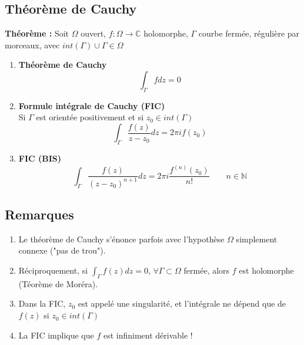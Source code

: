 \subsection{Théorème de Cauchy}
\textbf{Théorème :} Soit $\Omega$ ouvert, $f : \Omega\to\mathbb{C}$ holomorphe, $\Gamma$ courbe fermée, régulière par morceaux, avec $int(\Gamma) \cup \Gamma \in \Omega$
\begin{enumerate}
    \item \textbf{Théorème de Cauchy}
    $$\int_{\Gamma}fdz = 0$$
    \item \textbf{Formule intégrale de Cauchy (FIC)}\\
    Si $\Gamma$ est orientée positivement et si $z_0\in int(\Gamma)$
    $$\int_{\Gamma}\frac{f(z)}{z-z_0}dz = 2\pi i f(z_0)$$
    \item \textbf{FIC (BIS)}
    $$\int_{\Gamma}\frac{f(z)}{(z-z_0)^{n+1}}dz = 2\pi i \frac{f^{(n)}(z_0)}{n!} \quad\quad n\in\mathbb{N}$$
\end{enumerate}

\subsection{Remarques}
\begin{enumerate}
    \item Le théorème de Cauchy s'énonce parfois avec l'hypothèse $\Omega$ simplement connexe ("pas de trou").
    \item Réciproquement, si $\int_{\Gamma}f(z)dz = 0$, $\forall\Gamma\subset\Omega$ fermée, alors $f$ est holomorphe (Téorème de Moréra).
    \item Dans la FIC, $z_0$ est appelé une singularité, et l'intégrale ne dépend que de $f(z)$ si $z_0\in int(\Gamma)$
    \item La FIC implique que $f$ est infiniment dérivable !
\end{enumerate}